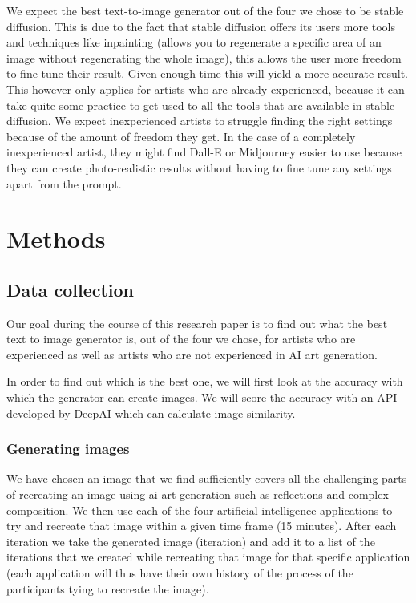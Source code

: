 \documentclass[]{report}
\begin{document}
\par\bigskip

We expect the best text-to-image generator out of the four we chose to be stable diffusion. This is due to the fact that stable diffusion offers its users more tools and techniques like inpainting (allows you to regenerate a specific area of an image without regenerating the whole image), this allows the user more freedom to fine-tune their result. Given enough time this will yield a more accurate result. This however only applies for artists who are already experienced, because it can take quite some practice to get used to all the tools that are available in stable diffusion. We expect inexperienced artists to struggle finding the right settings because of the amount of freedom they get. In the case of a completely inexperienced artist, they might find Dall-E or Midjourney easier to use because they can create photo-realistic results without having to fine tune any settings apart from the prompt.
	
\pagebreak
	
	\section{Methods}
	
	\subsection{Data collection}
	Our goal during the course of this research paper is to find out what the best text to image generator is, out of the four we chose, for artists who are experienced as well as artists who are not experienced in AI art generation.
	
	In order to find out which is the best one, we will first look at the accuracy with which the generator can create images. We will score the accuracy with an API developed by DeepAI which can calculate image similarity.
	
	\subsubsection{Generating images}
	We have chosen an image that we find sufficiently covers all the challenging parts of recreating an image using ai art generation such as reflections and complex composition. We then use each of the four artificial intelligence applications to try and recreate that image within a given time frame (15 minutes). After each iteration we take the generated image (iteration) and add it to a list of the iterations that we created while recreating that image for that specific application (each application will thus have their own history of the process of the participants tying to recreate the image). 
	
\end{document}
